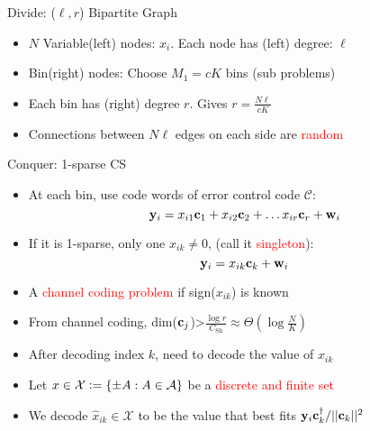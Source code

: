 \documentclass[final]{beamer}
\newlength{\twocolwid}
\newlength{\blockskip}
\begin{document}
\begin{frame}
\begin{columns}[t]
\begin{column}{\twocolwid}
    \begin{block}{\Large Divide: ($\ell,r$) Bipartite Graph}
    \begin{itemize}
	    \item $N$ Variable(left) nodes: $x_i$. Each node has (left) degree: $\ell$
	    \item Bin(right) nodes: Choose $M_1=cK$ bins (sub problems)
	    \item  Each bin has (right) degree $r$. Gives $r=\frac{N\ell}{cK}$
	    \item Connections between $N\ell$ edges on each side are \textcolor{red}{random}
    \end{itemize}
    \end{block}  
\vspace{\blockskip}

    \begin{block}{\Large Conquer: 1-sparse CS}
	    \begin{itemize}
    		\item At each bin, use code words of error control code $\mathcal{C}$:
		    	\begin{equation*}
				    \mathbf{y}_i=x_{i1}\mathbf{c}_1 +x_{i2}\mathbf{c}_{2}+\ldots x_{ir}\mathbf{c}_{r}+\mathbf{w}_i
			    \end{equation*}
    		\item If it is 1-sparse, only one $x_{ik}\neq 0$, (call it \textcolor{red}{singleton}):
		        \begin{equation*}
				    \mathbf{y}_i=x_{ik}\mathbf{c}_k +\mathbf{w}_i
		        \end{equation*}
		    \item A \textcolor{red}{channel coding problem} if sign($x_{ik}$) is known
		    \item  From channel coding, dim($\mathbf{c}_j$)>$\frac{\log r}{C_{\text{Sh}}}\approx \Theta(\log \frac{N}{K})$ 
           \item After decoding index $k$, need to decode the value of $x_{ik}$
		    \item Let $x\in\mathcal{X}\mathrel{\mathop:}=\{\pm A: A\in \mathcal{A}\}$ be a \textcolor{red}{discrete and finite set}
		    \item We decode $\hat{x}_{ik}\in\mathcal{X}$ to be the value that best fits $\mathbf{y}_i\mathbf{c}_{k}^{\dagger}/||\mathbf{c}_{k}||^{2}$
    	\end{itemize}
    \end{block}      
\vspace{\blockskip}



\end{column}
\end{columns}
\end{frame}
\end{document}
